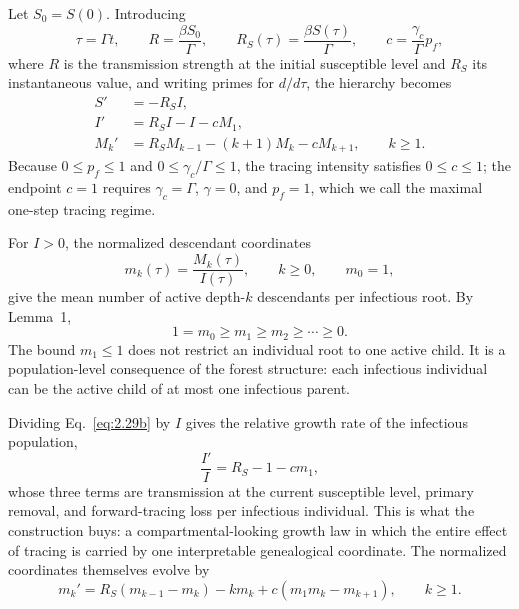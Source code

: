 \documentclass[review,12pt]{elsarticle}
\numberwithin{equation}{section}
\theoremstyle{remark}
\begin{document}
Let $S_0=S(0)$. Introducing
\begin{equation}
\tau = \Gamma t, \qquad R = \frac{\beta S_0}{\Gamma}, \qquad R_S(\tau) = \frac{\beta S(\tau)}{\Gamma}, \qquad c = \frac{\gamma_c}{\Gamma} p_f,
\label{eq:2.28}
\end{equation}
where $R$ is the transmission strength at the initial susceptible level and $R_S$ its instantaneous value, and writing primes for $d/d\tau$, the hierarchy becomes
\begin{align}
S' &= -R_S I, \label{eq:2.29a}\\
I' &= R_S I - I - c M_1, \label{eq:2.29b}\\
M_k' &= R_S M_{k-1} - (k+1)M_k - c M_{k+1}, \qquad k\geq1. \label{eq:2.29c}
\end{align}
Because $0\leq p_f\leq1$ and $0\leq\gamma_c/\Gamma\leq1$, the tracing intensity satisfies $0\leq c\leq1$; the endpoint $c=1$ requires $\gamma_c=\Gamma$, $\gamma=0$, and $p_f=1$, which we call the maximal one-step tracing regime.

For $I>0$, the normalized descendant coordinates
\begin{equation}
m_k(\tau) = \frac{M_k(\tau)}{I(\tau)}, \qquad k\geq0, \qquad m_0=1,
\label{eq:2.30}
\end{equation}
give the mean number of active depth-$k$ descendants per infectious root. By Lemma~1,
\begin{equation}
1 = m_0 \geq m_1 \geq m_2 \geq \cdots \geq 0.
\label{eq:2.31}
\end{equation}
The bound $m_1\leq1$ does not restrict an individual root to one active child. It is a population-level consequence of the forest structure: each infectious individual can be the active child of at most one infectious parent.

Dividing Eq.~\eqref{eq:2.29b} by $I$ gives the relative growth rate of the infectious population,
\begin{equation}
\frac{I'}{I} = R_S - 1 - c m_1,
\label{eq:2.32}
\end{equation}
whose three terms are transmission at the current susceptible level, primary removal, and forward-tracing loss per infectious individual. This is what the construction buys: a compartmental-looking growth law in which the entire effect of tracing is carried by one interpretable genealogical coordinate. The normalized coordinates themselves evolve by
\begin{equation}
m_k' = R_S(m_{k-1}-m_k) - k m_k + c(m_1 m_k - m_{k+1}), \qquad k\geq1.
\label{eq:2.33}
\end{equation}
\end{document}

